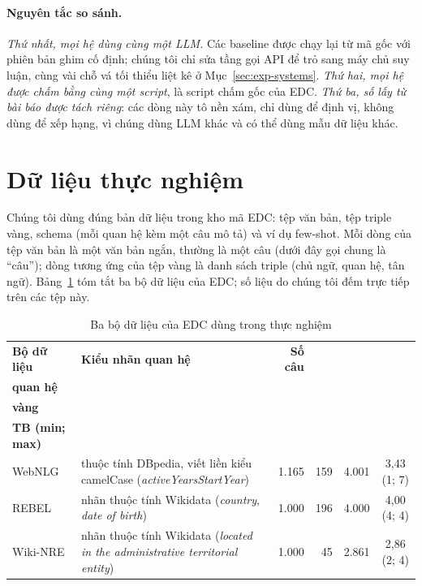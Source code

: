 \paragraph*{Nguyên tắc so sánh.}
\textit{Thứ nhất, mọi hệ dùng cùng một LLM.}
Các baseline được chạy lại từ mã gốc với phiên bản ghim cố định; chúng tôi chỉ sửa tầng gọi API để trỏ sang máy chủ suy luận, cùng vài chỗ vá tối thiểu liệt kê ở Mục~\ref{sec:exp-systems}.
\textit{Thứ hai, mọi hệ được chấm bằng cùng một script}, là script chấm gốc của EDC.
\textit{Thứ ba, số lấy từ bài báo được tách riêng}: các dòng này tô nền xám, chỉ dùng để định vị, không dùng để xếp hạng, vì chúng dùng LLM khác và có thể dùng mẫu dữ liệu khác.

\section{Dữ liệu thực nghiệm}\label{sec:exp-data}

Chúng tôi dùng đúng bản dữ liệu trong kho mã EDC: tệp văn bản, tệp triple vàng, schema (mỗi quan hệ kèm một câu mô tả) và ví dụ few-shot.
Mỗi dòng của tệp văn bản là một văn bản ngắn, thường là một câu (dưới đây gọi chung là ``câu''); dòng tương ứng của tệp vàng là danh sách triple (chủ ngữ, quan hệ, tân ngữ).
Bảng~\ref{tab:datasets} tóm tắt ba bộ dữ liệu của EDC; số liệu do chúng tôi đếm trực tiếp trên các tệp này.

\begin{table}[htbp]
\centering
\caption{Ba bộ dữ liệu của EDC dùng trong thực nghiệm}\label{tab:datasets}
\small
\begin{tabular}{l >{\raggedright\arraybackslash}p{4.4cm} r r r c}
\toprule
\textbf{Bộ dữ liệu} & \textbf{Kiểu nhãn quan hệ} & \textbf{Số câu} & \makecell{\textbf{Số}\\\textbf{quan hệ}} & \makecell{\textbf{Triple}\\\textbf{vàng}} & \makecell{\textbf{Triple/câu}\\\textbf{TB (min; max)}} \\
\midrule
WebNLG & thuộc tính DBpedia, viết liền kiểu camelCase (\textit{activeYearsStartYear}) & 1.165 & 159 & 4.001 & 3,43 (1; 7) \\
REBEL~\cite{cabot2021rebel} & nhãn thuộc tính Wikidata (\textit{country}, \textit{date of birth}) & 1.000 & 196 & 4.000 & 4,00 (4; 4) \\
Wiki-NRE & nhãn thuộc tính Wikidata (\textit{located in the administrative territorial entity}) & 1.000 & 45 & 2.861 & 2,86 (2; 4) \\
\bottomrule
\end{tabular}
\end{table}

